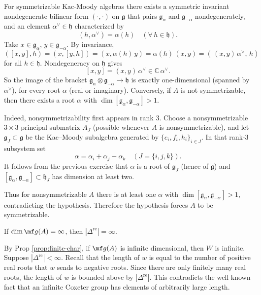 \documentclass[12pt]{article}
\begin{document}
\begin{solution}
    For symmetrizable Kac-Moody algebras there exists a symmetric invariant nondegenerate bilinear form $(\cdot,\cdot)$ on $\mathfrak{g}$ that pairs $\mathfrak{g}_\alpha$ and $\mathfrak{g}_{-\alpha}$ nondegenerately, and an element $\alpha^\vee\in\mathfrak{h}$ characterized by
    \[
        (h,\alpha^\vee)=\alpha(h) \quad (\forall\,h\in\mathfrak{h}).
    \]
    Take $x\in\mathfrak{g}_\alpha$, $y\in\mathfrak{g}_{-\alpha}$. By invariance,
    \[
        ([x,y],h)=(x,[y,h])=(x,\alpha(h)\,y)=\alpha(h)\,(x,y)=(\,(x,y)\,\alpha^\vee,\,h)
    \]
    for all $h\in\mathfrak{h}$. Nondegeneracy on $\mathfrak{h}$ gives
    \[
        [x,y]=(x,y)\,\alpha^\vee \in \mathbb{C}\,\alpha^\vee.
    \]
    So the image of the bracket $\mathfrak{g}_\alpha\otimes \mathfrak{g}_{-\alpha}\to \mathfrak{h}$ is exactly one-dimensional (spanned by $\alpha^\vee$), for every root $\alpha$ (real or imaginary). Conversely, if $A$ is not symmetrizable, then there exists a root $\alpha$ with $\dim[\mathfrak{g}_\alpha,\mathfrak{g}_{-\alpha}]>1$.

    Indeed, nonsymmetrizability first appears in rank 3. Choose a nonsymmetrizable $3\times3$ principal submatrix $A_J$ (possible whenever $A$ is nonsymmetrizable), and let $\mathfrak{g}_J\subset \mathfrak{g}$ be the Kac–Moody subalgebra generated by $\{e_i,f_i,h_i\}_{i\in J}$. In that rank-3 subsystem set
    \[
        \alpha=\alpha_i+\alpha_j+\alpha_k\quad (J=\{i,j,k\}).
    \]
    It follows from the previous exercise that $\alpha$ is a root of $\mathfrak{g}_J$ (hence of $\mathfrak{g}$) and $[\mathfrak{g}_\alpha,\mathfrak{g}_{-\alpha}]\subset \mathfrak{h}_J$ has dimension at least two.

    Thus for nonsymmetrizable $A$ there is at least one $\alpha$ with $\dim[\mathfrak{g}_\alpha,\mathfrak{g}_{-\alpha}]>1$, contradicting the hypothesis. Therefore the hypothesis forces $A$ to be symmetrizable.
\end{solution}

\begin{exercise}
    If $\dim \mf g(A) = \infty$, then $|\Delta^{\mathrm{re}}| = \infty$.
\end{exercise}

\begin{solution}
    By Prop \ref{prop:finite-char}, if $\mf g(A)$ is infinite dimensional, then $W$ is infinite. Suppose $|\Delta^{\mathrm{re}}|<\infty$. Recall that the length of $w$ is equal to the number of positive real roots that $w$ sends to negative roots. Since there are only finitely many real roots, the length of $w$ is bounded above by $|\Delta^{\mathrm{re}}|$. This contradicts the well known fact that an infinite Coxeter group has elements of arbitrarily large length.
\end{solution}
\end{document}
